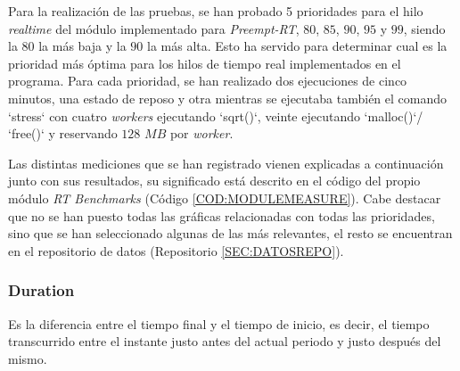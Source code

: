 Para la realización de las pruebas, se han probado 5 prioridades para el hilo \textit{realtime} del módulo implementado para \textit{Preempt-RT}, $80$, $85$, $90$, $95$ y $99$, siendo la $80$ la más baja y la $90$ la más alta. Esto ha servido para determinar cual es la prioridad más óptima para los hilos de tiempo real implementados en el programa. Para cada prioridad, se han realizado dos ejecuciones de cinco minutos, una estado de reposo y otra mientras se ejecutaba también el comando `stress` con cuatro \textit{workers} ejecutando `sqrt()`, veinte ejecutando `malloc()`/ `free()` y reservando $128$ $MB$ por \textit{worker}.

Las distintas mediciones que se han registrado vienen explicadas a continuación junto con sus resultados, su significado está descrito en el código del propio módulo \textit{RT Benchmarks} (Código \ref{COD:MODULEMEASURE}). Cabe destacar que no se han puesto todas las gráficas relacionadas con todas las prioridades, sino que se han seleccionado algunas de las más relevantes, el resto se encuentran en el repositorio de datos (Repositorio \ref{SEC:DATOSREPO}).






\subsubsection{Duration\label{SSS:DURATION}}


Es la diferencia entre el tiempo final y el tiempo de inicio, es decir, el tiempo transcurrido entre el instante justo antes del actual periodo y justo después del mismo.

